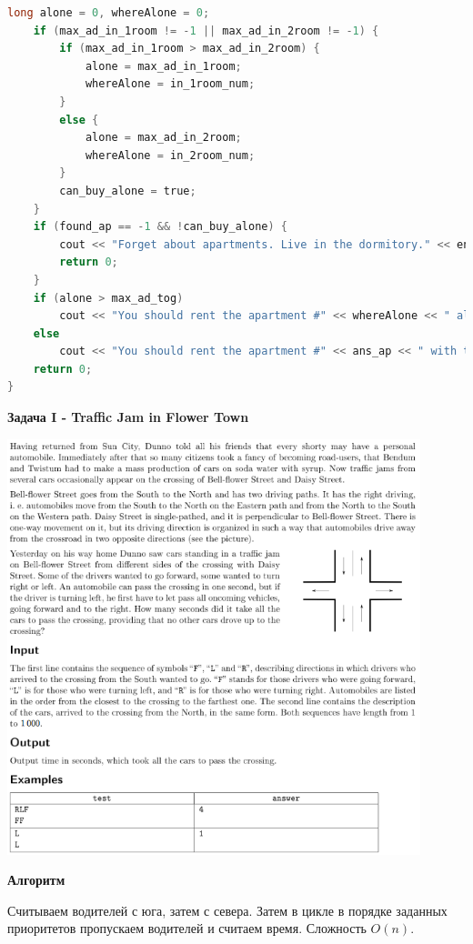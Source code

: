 \documentclass[a4paper,12pt]{article}
\begin{document}
\begin{lstlisting}[language=C]
    long alone = 0, whereAlone = 0;
    if (max_ad_in_1room != -1 || max_ad_in_2room != -1) {
        if (max_ad_in_1room > max_ad_in_2room) {
            alone = max_ad_in_1room;
            whereAlone = in_1room_num;
        }
        else {
            alone = max_ad_in_2room;
            whereAlone = in_2room_num;
        }
        can_buy_alone = true;
    }
    if (found_ap == -1 && !can_buy_alone) {
        cout << "Forget about apartments. Live in the dormitory." << endl;
        return 0;
    }
    if (alone > max_ad_tog)
        cout << "You should rent the apartment #" << whereAlone << " alone." << endl;
    else
        cout << "You should rent the apartment #" << ans_ap << " with the friend #" << ans_fr << "." << endl;
    return 0;
}
\end{lstlisting}

\newpage
\textbf{{\large Задача I - Traffic Jam in Flower Town}}

\begin{center}
\includegraphics[width=0.9\textwidth]{CT_ACM_EAST/CT_ACM_EAST_I.png}\\ [1cm]
\end{center}

\textbf{{\large Алгоритм}}

Считываем водителей с юга, затем с севера. Затем в цикле в порядке заданных приоритетов пропускаем водителей и считаем время. Сложность $O(n)$.
\end{document}
